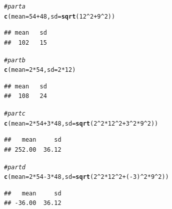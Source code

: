 \documentclass[twoside]{book}\usepackage[]{graphicx}\usepackage[]{xcolor}
\makeatletter
\newcommand{\hlnum}[1]{\textcolor[rgb]{0.686,0.059,0.569}{#1}}%
\newcommand{\hlcom}[1]{\textcolor[rgb]{0.678,0.584,0.686}{\textit{#1}}}%
\newcommand{\hlopt}[1]{\textcolor[rgb]{0,0,0}{#1}}%
\newcommand{\hlstd}[1]{\textcolor[rgb]{0.345,0.345,0.345}{#1}}%
\newcommand{\hlkwc}[1]{\textcolor[rgb]{0.333,0.667,0.333}{#1}}%
\newcommand{\hlkwd}[1]{\textcolor[rgb]{0.737,0.353,0.396}{\textbf{#1}}}%
\newenvironment{kframe}{%
 \def\at@end@of@kframe{}%
 \ifinner\ifhmode%
  \def\at@end@of@kframe{\end{minipage}}%
  \begin{minipage}{\columnwidth}%
 \fi\fi%
 \def\FrameCommand##1{\hskip\@totalleftmargin \hskip-\fboxsep
 \colorbox{shadecolor}{##1}\hskip-\fboxsep
     \hskip-\linewidth \hskip-\@totalleftmargin \hskip\columnwidth}%
 \MakeFramed {\advance\hsize-\width
   \@totalleftmargin\z@ \linewidth\hsize
   \@setminipage}}%
 {\par\unskip\endMakeFramed%
 \at@end@of@kframe}
\newenvironment{knitrout}{}{} %
\makeatother
\begin{document}
\begin{solution}
\begin{knitrout}
\color{fgcolor}\begin{kframe}
\begin{alltt}
\hlcom{# part a}
\hlkwd{c}\hlstd{(}\hlkwc{mean} \hlstd{=} \hlnum{54} \hlopt{+} \hlnum{48}\hlstd{,} \hlkwc{sd}\hlstd{=} \hlkwd{sqrt}\hlstd{(}\hlnum{12}\hlopt{^}\hlnum{2} \hlopt{+} \hlnum{9}\hlopt{^}\hlnum{2}\hlstd{))}
\end{alltt}
\begin{verbatim}
## mean   sd 
##  102   15
\end{verbatim}
\begin{alltt}
\hlcom{# part b}
\hlkwd{c}\hlstd{(}\hlkwc{mean} \hlstd{=} \hlnum{2} \hlopt{*} \hlnum{54}\hlstd{,} \hlkwc{sd}\hlstd{=} \hlnum{2} \hlopt{*} \hlnum{12}\hlstd{)}
\end{alltt}
\begin{verbatim}
## mean   sd 
##  108   24
\end{verbatim}
\begin{alltt}
\hlcom{# part c}
\hlkwd{c}\hlstd{(}\hlkwc{mean} \hlstd{=} \hlnum{2} \hlopt{*} \hlnum{54} \hlopt{+} \hlnum{3} \hlopt{*} \hlnum{48}\hlstd{,} \hlkwc{sd}\hlstd{=} \hlkwd{sqrt}\hlstd{(}\hlnum{2}\hlopt{^}\hlnum{2} \hlopt{*} \hlnum{12}\hlopt{^}\hlnum{2} \hlopt{+} \hlnum{3}\hlopt{^}\hlnum{2} \hlopt{*} \hlnum{9}\hlopt{^}\hlnum{2}\hlstd{))}
\end{alltt}
\begin{verbatim}
##   mean     sd 
## 252.00  36.12
\end{verbatim}
\begin{alltt}
\hlcom{# part d}
\hlkwd{c}\hlstd{(}\hlkwc{mean} \hlstd{=} \hlnum{2} \hlopt{*} \hlnum{54} \hlopt{-} \hlnum{3} \hlopt{*} \hlnum{48}\hlstd{,} \hlkwc{sd}\hlstd{=} \hlkwd{sqrt}\hlstd{(}\hlnum{2}\hlopt{^}\hlnum{2} \hlopt{*} \hlnum{12}\hlopt{^}\hlnum{2} \hlopt{+} \hlstd{(}\hlopt{-}\hlnum{3}\hlstd{)}\hlopt{^}\hlnum{2} \hlopt{*} \hlnum{9}\hlopt{^}\hlnum{2}\hlstd{))}
\end{alltt}
\begin{verbatim}
##   mean     sd 
## -36.00  36.12
\end{verbatim}
\end{kframe}
\end{knitrout}
\end{solution}
\end{document}
